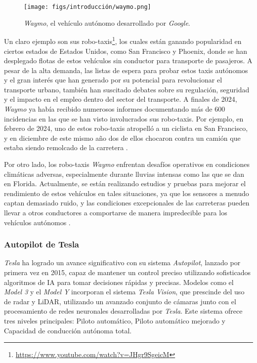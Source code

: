 \begin{figure}[ht]
\begin{center}
\texttt{[image: figs/introducción/waymo.png]}
\end{center}
\caption{\textit{Waymo}, el vehículo autónomo desarrollado por \textit{Google}.}
\label{waymo}
\end{figure}

Un claro ejemplo son sus robo-taxis\footnote{\url{https://www.youtube.com/watch?v=JHgr9SgeicM}}, los cuales están ganando popularidad en ciertos estados de Estados Unidos, como San Francisco y Phoenix, donde se han desplegado flotas de estos vehículos sin conductor para transporte de pasajeros. A pesar de la alta demanda, las listas de espera para probar estos taxis autónomos y el gran interés que han generado por su potencial para revolucionar el transporte urbano, también han suscitado debates sobre su regulación, seguridad y el impacto en el empleo dentro del sector del transporte. A finales de 2024, \textit{Waymo} ya había recibido numerosos informes documentando más de 600 incidencias en las que se han visto involucrados sus robo-taxis. Por ejemplo, en febrero de 2024, uno de estos robo-taxis atropelló a un ciclista en San Francisco, y en diciembre de este mismo año dos de ellos chocaron contra un camión que estaba siendo remolcado de la carretera \cite{waymo-wiki}. 

Por otro lado, los robo-taxis \textit{Waymo} enfrentan desafíos operativos en condiciones climáticas adversas, especialmente durante lluvias intensas como las que se dan en Florida. Actualmente, se están realizando estudios y pruebas para mejorar el rendimiento de estos vehículos en tales situaciones, ya que los sensores a menudo captan demasiado ruido, y las condiciones excepcionales de las carreteras pueden llevar a otros conductores a comportarse de manera impredecible para los vehículos autónomos \cite{waymo-florida}.

\subsubsection{Autopilot de Tesla}

\textit{Tesla} ha logrado un avance significativo con su sistema \textit{Autopilot}, lanzado por primera vez en 2015, capaz de mantener un control preciso utilizando sofisticados algoritmos de \ac{IA} para tomar decisiones rápidas y precisas. Modelos como el \textit{Model 3} y el \textit{Model Y} incorporan el sistema \textit{Tesla Vision}, que prescinde del uso de radar y \ac{LiDAR}, utilizando un avanzado conjunto de cámaras junto con el procesamiento de redes neuronales desarrolladas por \textit{Tesla}. Este sistema ofrece tres niveles principales: Piloto automático, Piloto automático mejorado y Capacidad de conducción autónoma total.

